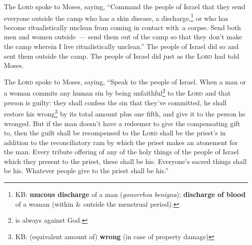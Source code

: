 
\begin{inparaenum}
     The \textsc{Lord} spoke to Moses, saying,%
     ``Command the people of Israel that they send everyone outside the camp who has a skin disease, a discharge,\footnote{KB: \textbf{mucous discharge} of a man (\textit{gonorrhea benigna}); \textbf{discharge of blood} of a woman (within \& outside the menstrual period).} or who has become ritualistically unclean from coming in contact with\understood\ a corpse.%
     Send both men and women outside~--- send them out of the camp so that they don't make the camp wherein I live ritualistically unclean.''%
     The people of Israel did so and sent them outside the camp. The people of Israel did just as the \textsc{Lord} had told Moses.%
    
     The \textsc{Lord} spoke to Moses, saying,%
     ``Speak to the people of Israel. When a man or a woman commits any human sin by being unfaithful\footnote{ is always against God.} to the \textsc{Lord} and that person is guilty:%
     they shall confess the sin that they've committed, he shall restore his wrong\footnote{KB: (equivalent amount of) \textbf{wrong} (in case of property damage)} by its total amount plus one fifth, and give it to the person he wronged.%
     But if the man doesn't have a redeemer to give the compensating gift to, then the guilt shall be recompensed to the \textsc{Lord} shall be the priest's in addition to the reconciliatory ram by which the priest makes an atonement for the man.%
     Every tribute offering of any of the holy things of the people of Israel which they present to the priest, these shall be his.%
     Everyone's sacred things shall be his. Whatever people give to the priest shall be his.''%
    

\end{inparaenum}
